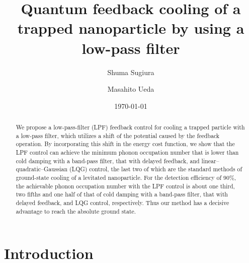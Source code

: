 \documentclass[aps,pra,superscriptaddress,twocolumn
]{revtex4-2}
\newcommand{\majrev}[1]{{#1}}
\begin{document}
\title{Quantum feedback cooling of a trapped nanoparticle by using a low-pass filter}
\author{Shuma Sugiura}
\author{Masahito Ueda}%
\date{\today}


\begin{abstract}
  We propose a low-pass-filter (LPF) feedback control for cooling a trapped particle with a low-pass filter, 
  \majrev{which utilizes a shift of the potential caused by the feedback operation.
 By incorporating this shift in the {energy cost function}, 
 we} show that the LPF control can achieve the minimum phonon occupation number that is lower 
 than {cold damping with a band-pass filter, that with delayed feedback, 
 and linear--quadratic--Gaussian (LQG) control, 
 the last two of which} are the standard methods of ground-state cooling of a levitated nanoparticle. 
 For the detection efficiency of $90\%$, the achievable phonon occupation number with the LPF control 
 {is about one third, two fifths and one half of that of cold damping with a band-pass filter, 
 that with delayed feedback,} and LQG control, respectively. 
 Thus our method has a decisive advantage to reach the absolute ground state.
 \end{abstract}
 
 \maketitle
 
 
 \section{Introduction}
 
 
 
\end{document}
